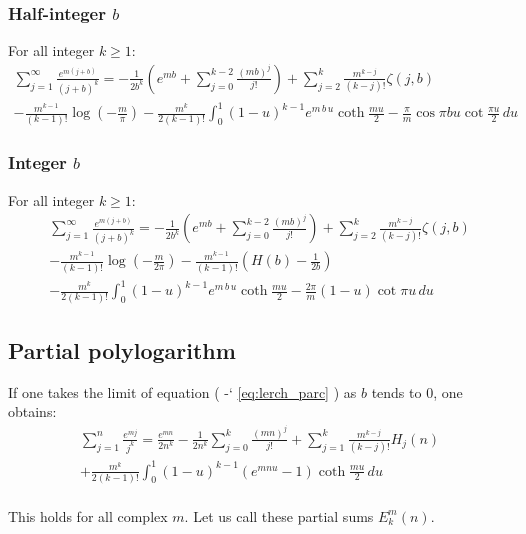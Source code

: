 \documentclass[12pt]{article}
\newcommand*{\eqrefe}[1]{%
\begingroup
(\color{BrickRed}
\romannumeral-`\x %
\setcitestyle{numbers}%
\ref{eq:#1}%
\endgroup
)\ignorespacesafterend
}
\begin{document}
\subsubsection{Half-integer $b$}
For all integer $k \ge 1$:
\begin{multline} \nonumber 
\sum _{j=1}^{\infty}\frac{e^{m(j+b)}}{(j+b)^{k}}=-\frac{1}{2b^{k}}\left(e^{m b}+\sum_{j=0}^{k-2}\frac{(m b)^j}{j!}\right)+\sum_{j=2}^{k}\frac{m^{k-j}}{(k-j)!}\zeta(j,b)\\-\frac{m^{k-1}}{(k-1)!}\log{\left(-\frac{m}{\pi}\right)}-\frac{m^{k}}{2(k-1)!}\int_0^1(1-u)^{k-1}e^{m\,b\,u}\coth{\frac{m u}{2}}-\frac{\pi}{m}\cos{\pi b u}\cot{\frac{\pi u}{2}}\,du 
\end{multline}

\subsubsection{Integer $b$}
For all integer $k \ge 1$:
\begin{multline} \nonumber 
\sum _{j=1}^{\infty}\frac{e^{m(j+b)}}{(j+b)^{k}}=-\frac{1}{2b^{k}}\left(e^{m b}+\sum_{j=0}^{k-2}\frac{(m b)^j}{j!}\right)+\sum_{j=2}^{k}\frac{m^{k-j}}{(k-j)!}\zeta(j,b)\\-\frac{m^{k-1}}{(k-1)!}\log{\left(-\frac{m}{2\pi}\right)}-\frac{m^{k-1}}{(k-1)!}\left(H(b)-\frac{1}{2b}\right)\\-\frac{m^{k}}{2(k-1)!}\int_0^1(1-u)^{k-1}e^{m\,b\,u}\coth{\frac{m u}{2}}-\frac{2\pi}{m}(1-u)\cot{\pi u}\,du 
\end{multline}

\subsection{Partial polylogarithm} \label{part2}
If one takes the limit of equation \eqrefe{lerch_parc} as $b$ tends to 0, one  obtains:
\begin{multline} \nonumber
\sum _{j=1}^n \frac{e^{m j}}{j^{k}}=\frac{e^{m n}}{2n^{k}}-\frac{1}{2n^{k}}\sum_{j=0}^{k}\frac{(m n)^j}{j!}+\sum_{j=1}^{k}\frac{m^{k-j}}{(k-j)!}H_{j}(n)\\
+\frac{m^{k}}{2(k-1)!}\int_0^1(1-u)^{k-1}\left(e^{m n u}-1\right)\coth{\frac{m u}{2}}\,du 
\end{multline}\\
\indent This holds for all complex $m$. Let us call these partial sums $E^m_k(n)$.
\end{document}
